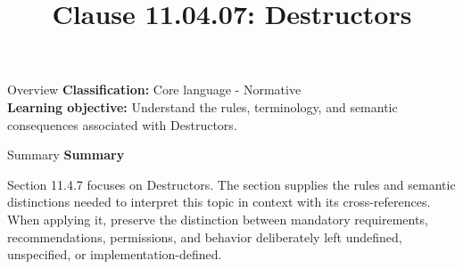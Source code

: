 \documentclass[10pt,letterpaper]{article}
\title{Clause 11.04.07: Destructors}
\author{}
\date{}
\begin{document}
\maketitle
\begin{CornellOverviewBox}{Overview}
\textbf{Classification:} Core language - Normative\\[2pt]
\textbf{Learning objective:} Understand the rules, terminology, and semantic consequences associated with Destructors.
\end{CornellOverviewBox}\begin{CornellSummaryBox}{Summary}
{\sffamily\bfseries\color{Accent} Summary}\par\vspace{3pt}Section 11.4.7 focuses on Destructors. The section supplies the rules and semantic distinctions needed to interpret this topic in context with its cross-references. When applying it, preserve the distinction between mandatory requirements, recommendations, permissions, and behavior deliberately left undefined, unspecified, or implementation-defined.
\end{CornellSummaryBox}
\end{document}
